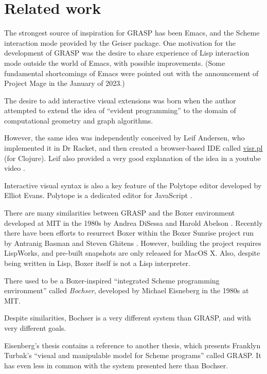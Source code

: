 \documentclass[sigconf]{acmart}
\begin{document}
\section{Related work}

The strongest source of inspiration for GRASP
has been Emacs\cite{Stallman}, and the Scheme interaction
mode provided by the Geiser package. One
motivation for the development of GRASP was
the desire to share experience of Lisp interaction
mode outside the world of Emacs, with possible
improvements. (Some fundamental shortcomings
of Emacs were pointed out with the announcement
of Project Mage in the January of 2023\cite{Korobeinikov}.)

The desire to add interactive visual extensions
was born when the author attempted to extend
the idea of ``evident programming'' to the domain
of computational geometry and graph algorithms.

However, the same idea was independently
conceived by Leif Andersen, who implemented
it in Dr Racket, and then created a browser-based
IDE called \url{visr.pl} (for Clojure). Leif also provided
a very good explanation of the idea in a youtube video \cite{Andersen}.

Interactive visual syntax is also a key feature
of the Polytope editor developed by Elliot Evans.
Polytope is a dedicated editor for JavaScript \cite{Evans}.

There are many similarities between GRASP and
the Boxer environment developed at MIT in the 1980s
by Andrea DiSessa and Harold Abelson \cite{Boxer}. Recently
there have been efforts to resurrect Boxer
within the Boxer Sunrise project run by Antranig
Basman and Steven Ghitens \cite{BoxerSunrise}. However, building
the project requires LispWorks, and pre-built
snapshots are only released for MacOS X. Also,
despite being written in Lisp, Boxer itself
is not a Lisp interpreter.

There used to be a Boxer-inspired ``integrated Scheme
programming environment'' called \textit{Bochser},
developed by Michael Eisneberg in the 1980s at MIT\cite{Bochser}.

Despite similarities, Bochser is a very different
system than GRASP, and with very different goals.

Eisenberg's thesis contains a reference to another
thesis, which presents Franklyn Turbak's ``visual
and manipulable model for Scheme programs'' called
GRASP\cite{Turbak}. It has even less in common
with the system presented here than Bochser.
\end{document}
